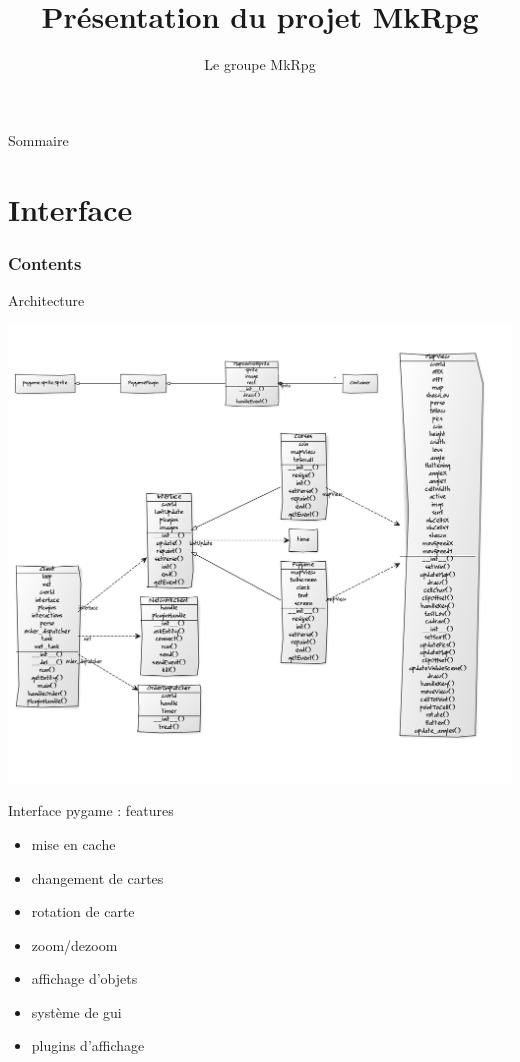 \documentclass[11pt]{beamer}
\author{Le groupe MkRpg}
\title{Présentation du projet MkRpg}
\begin{document}
\begin{frame}
\titlepage
\end{frame}

\begin{frame}{Sommaire}
\tableofcontents
\end{frame}




\section{Interface}
    \begin{frame}
        \frametitle{Contents}
        \tableofcontents[currentsection]
    \end{frame}

\begin{frame}{Architecture}
	\begin{center}\includegraphics[scale=0.21]{uml_pygame.png}\end{center}
\end{frame}

\begin{frame}{Interface pygame : features}
	\begin{itemize}
		\item mise en cache
    \item changement de cartes
    \item rotation de carte
    \item zoom/dezoom
    \item affichage d'objets
    \item système de gui
    \item plugins d'affichage
	\end{itemize}
\end{frame}
\end{document}
